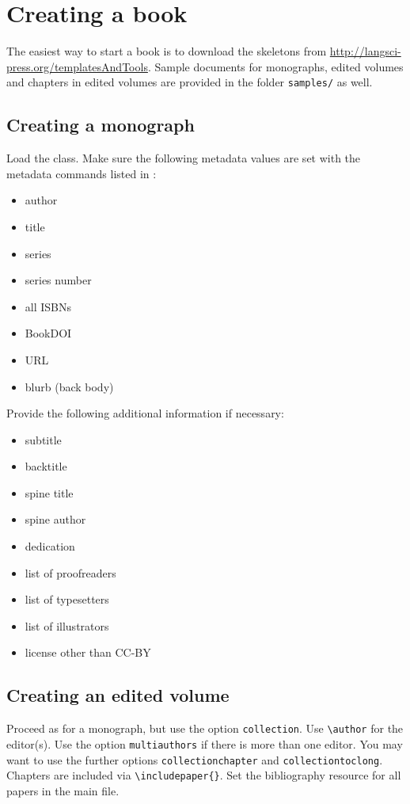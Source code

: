 \documentclass[%
output=guidelines,
guidelines]{langscibook}
\begin{document}
\chapter{Creating a book}
The easiest way to start a book is to download the skeletons from \url{http://langsci-press.org/templatesAndTools}. Sample documents for monographs, edited volumes and chapters in edited volumes are provided in the folder \texttt{samples/} as well. 

\section{Creating a monograph}
Load the class. Make sure the following metadata values are set with the metadata commands listed in :

\begin{itemize}
 \item author 
 \item title
 \item series 
 \item series number
 \item all ISBNs
 \item BookDOI
 \item URL
 \item blurb (back body)
\end{itemize}

Provide the following additional information if necessary:
\begin{itemize}
 \item subtitle
 \item backtitle
 \item spine title 
 \item spine author
 \item dedication 
 \item list of proofreaders 
 \item list of typesetters
 \item list of illustrators 
 \item license other than CC-BY
\end{itemize}

 
\section{Creating an edited volume}
Proceed as for a monograph, but use the option \texttt{collection}. Use \verb+\author+ for the editor(s). Use the option \texttt{multiauthors} if there is more than one editor. You may want to use the further options \texttt{collectionchapter} and \texttt{collectiontoclong}. Chapters are included via \verb+\includepaper{}+. Set the bibliography resource for all papers in the main file. 
\end{document}
